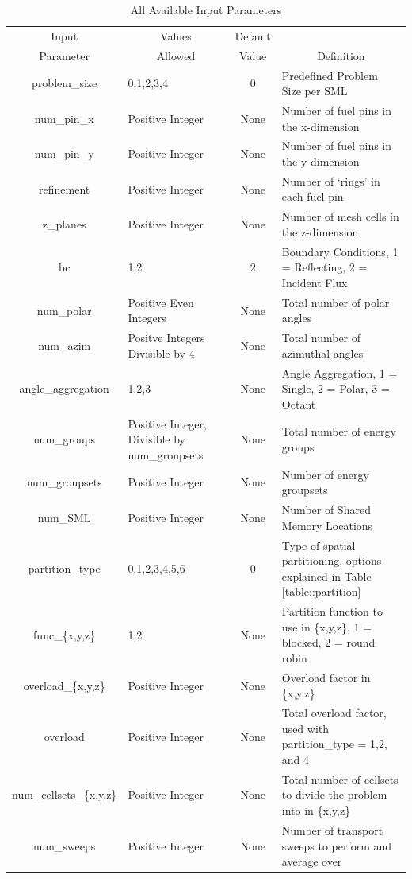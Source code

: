 \documentclass{article}
\begin{document}
\begin{table}[h!]
\begin{center}
  \begin{tabular}{ |c|p{5cm}|c|p{6.4cm}|}
    \hline
    Input &\multicolumn{1}{c|}{ Values} &  Default& \\ 
    Parameter & \multicolumn{1}{c|}{Allowed}&Value& \multicolumn{1}{c|}{Definition}\\
    \hline
    problem\_size & 0,1,2,3,4 & 0& Predefined Problem Size per SML\\  \hline
    num\_pin\_x& Positive Integer & None &  Number of fuel pins in the x-dimension\\ 
    num\_pin\_y& Positive Integer & None &  Number of fuel pins in the y-dimension\\
    refinement & Positive Integer & None & Number of `rings' in each fuel pin \\
    z\_planes& Positive Integer & None &  Number of mesh cells in the z-dimension\\ 
    bc & 1,2 & 2 & Boundary Conditions, 1 = Reflecting, 2 = Incident Flux \\ \hline
    num\_polar & Positive Even Integers& None &  Total number of polar angles \\
    num\_azim & Positve Integers Divisible by 4&  None& Total number of azimuthal angles \\
    angle\_aggregation & 1,2,3 & None & Angle Aggregation, 1 = Single, 2 = Polar, 3 = Octant \\ \hline
    num\_groups & Positive Integer, Divisible by num\_groupsets & None & Total number of energy groups \\ 
    num\_groupsets & Positive Integer & None & Number of energy groupsets \\ \hline
    num\_SML & Positive Integer & None & Number of Shared Memory Locations \\
    partition\_type & 0,1,2,3,4,5,6 & 0 & Type of spatial partitioning, options explained in Table \ref{table::partition} \\
    func\_\{x,y,z\} & 1,2 & None & Partition function to use in \{x,y,z\}, 1 = blocked, 2 = round robin \\
    overload\_\{x,y,z\} & Positive Integer & None & Overload factor in \{x,y,z\} \\
    overload & Positive Integer & None & Total overload factor, used with partition\_type = 1,2, and 4 \\
    num\_cellsets\_\{x,y,z\} & Positive Integer & None & Total number of cellsets to divide the problem into in \{x,y,z\} \\ 
    num\_sweeps & Positive Integer & None & Number of transport sweeps to perform and average over \\
    \hline
  \end{tabular} 
      \caption{All Available Input Parameters}
      \label{table::parameters}
\end{center}
\end{table}
\end{document}
